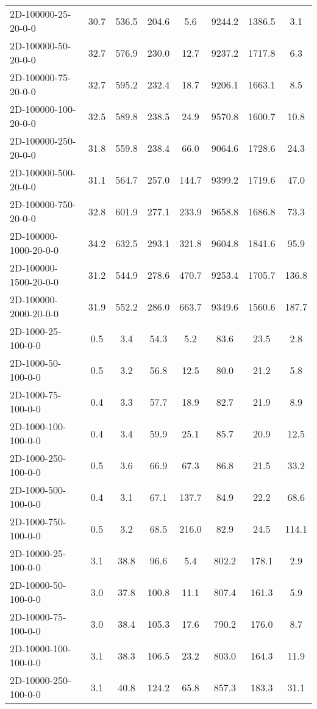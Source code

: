 \documentclass{article}
\begin{document}
\begin{center}
\begin{table}[h]
\begin{tabular}{|l||c|c|c|c|c|c|c|}
    \hline
    2D-100000-25-20-0-0 & 30.7 & 536.5 & 204.6 & 5.6 & 9244.2 & 1386.5 & 3.1 \\
    2D-100000-50-20-0-0 & 32.7 & 576.9 & 230.0 & 12.7 & 9237.2 & 1717.8 & 6.3 \\
    2D-100000-75-20-0-0 & 32.7 & 595.2 & 232.4 & 18.7 & 9206.1 & 1663.1 & 8.5 \\
    2D-100000-100-20-0-0 & 32.5 & 589.8 & 238.5 & 24.9 & 9570.8 & 1600.7 & 10.8 \\
    2D-100000-250-20-0-0 & 31.8 & 559.8 & 238.4 & 66.0 & 9064.6 & 1728.6 & 24.3 \\
    2D-100000-500-20-0-0 & 31.1 & 564.7 & 257.0 & 144.7 & 9399.2 & 1719.6 & 47.0 \\
    2D-100000-750-20-0-0 & 32.8 & 601.9 & 277.1 & 233.9 & 9658.8 & 1686.8 & 73.3 \\
    2D-100000-1000-20-0-0 & 34.2 & 632.5 & 293.1 & 321.8 & 9604.8 & 1841.6 & 95.9 \\
    2D-100000-1500-20-0-0 & 31.2 & 544.9 & 278.6 & 470.7 & 9253.4 & 1705.7 & 136.8 \\
    2D-100000-2000-20-0-0 & 31.9 & 552.2 & 286.0 & 663.7 & 9349.6 & 1560.6 & 187.7 \\
    \hline
    2D-1000-25-100-0-0 & 0.5 & 3.4 & 54.3 & 5.2 & 83.6 & 23.5 & 2.8 \\
    2D-1000-50-100-0-0 & 0.5 & 3.2 & 56.8 & 12.5 & 80.0 & 21.2 & 5.8 \\
    2D-1000-75-100-0-0 & 0.4 & 3.3 & 57.7 & 18.9 & 82.7 & 21.9 & 8.9 \\
    2D-1000-100-100-0-0 & 0.4 & 3.4 & 59.9 & 25.1 & 85.7 & 20.9 & 12.5 \\
    2D-1000-250-100-0-0 & 0.5 & 3.6 & 66.9 & 67.3 & 86.8 & 21.5 & 33.2 \\
    2D-1000-500-100-0-0 & 0.4 & 3.1 & 67.1 & 137.7 & 84.9 & 22.2 & 68.6 \\
    2D-1000-750-100-0-0 & 0.5 & 3.2 & 68.5 & 216.0 & 82.9 & 24.5 & 114.1 \\
    \hline
    2D-10000-25-100-0-0 & 3.1 & 38.8 & 96.6 & 5.4 & 802.2 & 178.1 & 2.9 \\
    2D-10000-50-100-0-0 & 3.0 & 37.8 & 100.8 & 11.1 & 807.4 & 161.3 & 5.9 \\
    2D-10000-75-100-0-0 & 3.0 & 38.4 & 105.3 & 17.6 & 790.2 & 176.0 & 8.7 \\
    2D-10000-100-100-0-0 & 3.1 & 38.3 & 106.5 & 23.2 & 803.0 & 164.3 & 11.9 \\
    2D-10000-250-100-0-0 & 3.1 & 40.8 & 124.2 & 65.8 & 857.3 & 183.3 & 31.1 \\

\end{tabular}
\end{table}
\end{center}
\end{document}
